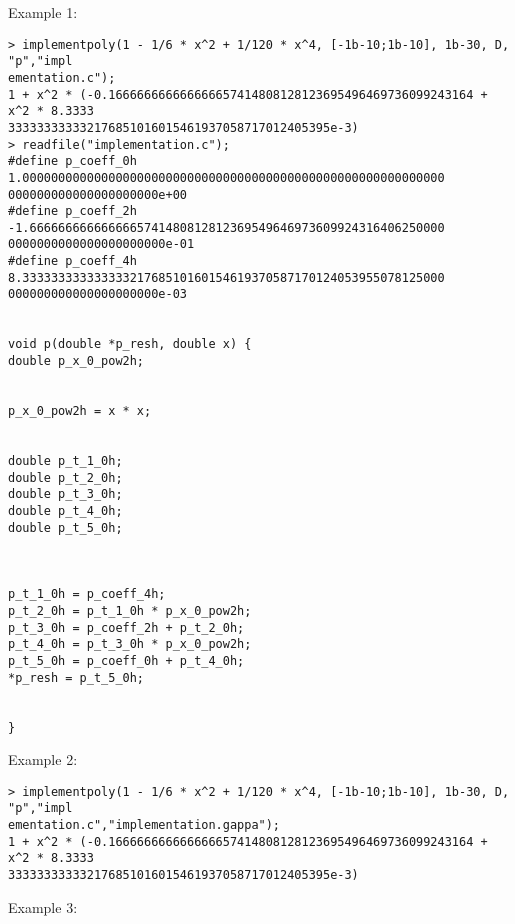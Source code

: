 \noindent Example 1: 
\begin{center}\begin{minipage}{15cm}\begin{Verbatim}[frame=single]
> implementpoly(1 - 1/6 * x^2 + 1/120 * x^4, [-1b-10;1b-10], 1b-30, D, "p","impl
ementation.c");
1 + x^2 * (-0.166666666666666657414808128123695496469736099243164 + x^2 * 8.3333
333333333332176851016015461937058717012405395e-3)
> readfile("implementation.c");
#define p_coeff_0h 1.00000000000000000000000000000000000000000000000000000000000
000000000000000000000e+00
#define p_coeff_2h -1.6666666666666665741480812812369549646973609924316406250000
0000000000000000000000e-01
#define p_coeff_4h 8.33333333333333321768510160154619370587170124053955078125000
000000000000000000000e-03


void p(double *p_resh, double x) {
double p_x_0_pow2h;


p_x_0_pow2h = x * x;


double p_t_1_0h;
double p_t_2_0h;
double p_t_3_0h;
double p_t_4_0h;
double p_t_5_0h;
 


p_t_1_0h = p_coeff_4h;
p_t_2_0h = p_t_1_0h * p_x_0_pow2h;
p_t_3_0h = p_coeff_2h + p_t_2_0h;
p_t_4_0h = p_t_3_0h * p_x_0_pow2h;
p_t_5_0h = p_coeff_0h + p_t_4_0h;
*p_resh = p_t_5_0h;


}

\end{Verbatim}
\end{minipage}\end{center}
\noindent Example 2: 
\begin{center}\begin{minipage}{15cm}\begin{Verbatim}[frame=single]
> implementpoly(1 - 1/6 * x^2 + 1/120 * x^4, [-1b-10;1b-10], 1b-30, D, "p","impl
ementation.c","implementation.gappa");
1 + x^2 * (-0.166666666666666657414808128123695496469736099243164 + x^2 * 8.3333
333333333332176851016015461937058717012405395e-3)
\end{Verbatim}
\end{minipage}\end{center}
\noindent Example 3: 
